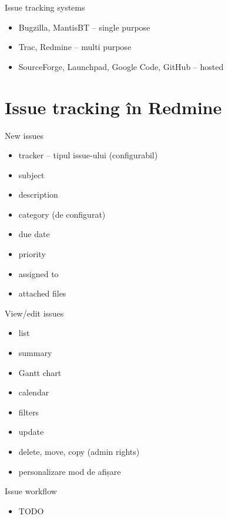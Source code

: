 \documentclass{beamer}
\begin{document}
\begin{frame}{Issue tracking systems}
  \begin{itemize}
    \item Bugzilla, MantisBT -- single purpose
    \item Trac, Redmine -- multi purpose
    \item SourceForge, Launchpad, Google Code, GitHub -- hosted
  \end{itemize}
\end{frame}

\section{Issue tracking în Redmine}

\begin{frame}{New issues}
  \begin{itemize}
    \item tracker -- tipul issue-ului (configurabil)
    \item subject
    \item description
    \item category (de configurat)
    \item due date
    \item priority
    \item assigned to
    \item attached files
  \end{itemize}
\end{frame}

\begin{frame}{View/edit issues}
  \begin{itemize}
    \item list
    \item summary
    \item Gantt chart
    \item calendar
    \item filters
    \item update
    \item delete, move, copy (admin rights)
    \item personalizare mod de afișare
  \end{itemize}
\end{frame}

\begin{frame}{Issue workflow}
  \begin{itemize}
    \item TODO
  \end{itemize}
\end{frame}
\end{document}
